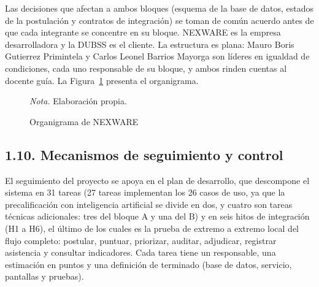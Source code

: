 Las decisiones que afectan a ambos bloques (esquema de la base de datos, estados de la postulación y contratos de integración) se toman de común acuerdo antes de que cada integrante se concentre en su bloque. NEXWARE es la empresa desarrolladora y la DUBSS es el cliente. La estructura es plana: Mauro Boris Gutierrez Primintela y Carlos Leonel Barrios Mayorga son líderes en igualdad de condiciones, cada uno responsable de su bloque, y ambos rinden cuentas al docente guía. La Figura~\ref{fig:organigrama} presenta el organigrama.

\begin{figure}[H]
\caption{Organigrama de NEXWARE}
\label{fig:organigrama}
\centering
{}

\smallskip

\noindent\raggedright\textit{Nota.} Elaboración propia.
\end{figure}

\subsection{1.10. Mecanismos de seguimiento y control}

El seguimiento del proyecto se apoya en el plan de desarrollo, que descompone el sistema en 31 tareas (27 tareas implementan los 26 casos de uso, ya que la precalificación con inteligencia artificial se divide en dos, y cuatro son tareas técnicas adicionales: tres del bloque A y una del B) y en seis hitos de integración (H1 a H6), el último de los cuales es la prueba de extremo a extremo local del flujo completo: postular, puntuar, priorizar, auditar, adjudicar, registrar asistencia y consultar indicadores. Cada tarea tiene un responsable, una estimación en puntos y una definición de terminado (base de datos, servicio, pantallas y pruebas).

